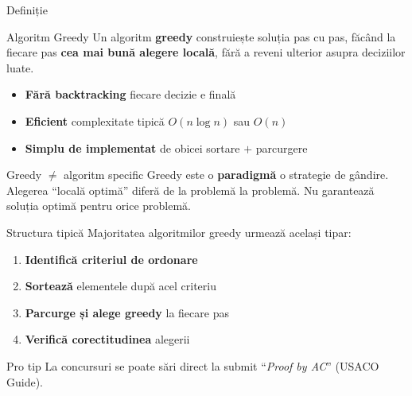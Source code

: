 \documentclass{beamer}
\begin{document}
\begin{frame}{Definiție}
  \begin{block}{Algoritm Greedy}
    Un algoritm \textbf{greedy} construiește soluția pas cu pas,
    făcând la fiecare pas \textbf{cea mai bună alegere locală},
    fără a reveni ulterior asupra deciziilor luate.
  \end{block}
  \smallskip
  \begin{itemize}
    \item \textbf{Fără backtracking} \textemdash{} fiecare decizie e finală
    \item \textbf{Eficient} \textemdash{} complexitate tipică $O(n \log n)$ sau $O(n)$
    \item \textbf{Simplu de implementat} \textemdash{} de obicei sortare $+$ parcurgere
  \end{itemize}
  \smallskip
  \begin{alertblock}{Greedy $\neq$ algoritm specific}
    Greedy este o \textbf{paradigmă} \textemdash{} o strategie de gândire.
    Alegerea ``locală optimă'' diferă de la problemă la problemă.
    \alert{Nu garantează soluția optimă pentru orice problemă.}
  \end{alertblock}
\end{frame}

\begin{frame}{Structura tipică}
  Majoritatea algoritmilor greedy urmează același tipar:
  \smallskip
  \begin{enumerate}\itemsep12pt
    \item \textbf{Identifică criteriul de ordonare}
    \item \textbf{Sortează} elementele după acel criteriu
    \item \textbf{Parcurge și alege greedy} la fiecare pas
    \item \textbf{Verifică corectitudinea} alegerii
  \end{enumerate}
  \smallskip
  \begin{block}{Pro tip}
    La concursuri se poate sări direct la submit \textemdash{}
    ``\textit{Proof by AC}'' (USACO Guide).
  \end{block}
\end{frame}
\end{document}
